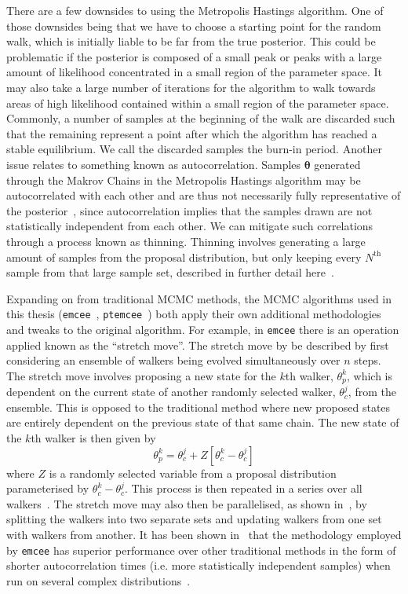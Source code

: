 %
%
%
There are a few downsides to using the Metropolis Hastings algorithm. One 
of those downsides being that we have to choose a starting point 
for the random walk, which is initially liable to be far from the 
true posterior. This could be problematic if the posterior is composed 
of a small peak or peaks with 
a large amount of likelihood concentrated in a small region of the 
parameter space. It may also take a large number of iterations for the 
algorithm to walk towards areas of high likelihood contained within 
a small region of the parameter space. Commonly, a number 
of samples at the beginning of the walk are discarded such that the 
remaining represent a point after which the algorithm has reached 
a stable equilibrium. We call the discarded samples 
the burn-in period. Another issue 
relates to something known as autocorrelation. Samples $\bm{\theta}$ 
generated through 
the Makrov Chains in the Metropolis Hastings algorithm may be 
autocorrelated with each 
other and are thus not necessarily fully 
representative of the posterior~\cite{2019PASA...36...10T}, since 
autocorrelation implies that the samples drawn are not statistically 
independent from each other. We can 
mitigate such correlations through a process known as thinning. 
Thinning involves generating a large amount of samples from the 
proposal distribution, but only keeping every $N^{\textrm{th}}$ 
sample from that large sample set, described in further detail
here~\cite{https://doi.org/10.1111/j.2041-210X.2011.00131.x}.  

%
%
Expanding on from traditional \ac{MCMC} methods, the \ac{MCMC} algorithms 
used in this thesis (\texttt{emcee}~\cite{emcee},
\texttt{ptemcee}~\cite{ptemcee}) both apply 
their own additional methodologies and tweaks to the original algorithm. 
For example, in \texttt{emcee} there is an operation applied known as the 
``stretch move''. The stretch move by be described by first 
considering an ensemble 
of walkers being evolved simultaneously over $n$ steps. The stretch 
move involves proposing a new state for the $k$th walker, $\theta_{p}^k$, 
which is dependent on the current state of another randomly 
selected walker, $\theta_{c}^{j}$, 
from the ensemble. This is opposed to the traditional method 
where new proposed states are entirely dependent on the previous state 
of that same chain. The new state of the $k$th walker is then given by 
%
\begin{equation}
    \theta_{p}^k = \theta_{c}^j + Z[\theta_{c}^k - \theta_{c}^j] 
\end{equation}
%
where $Z$ is a randomly selected variable from a proposal distribution 
parameterised by $\theta_{c}^k - \theta_{c}^j$. This process is then 
repeated in a series over all walkers~\cite{emcee}. The stretch move may also 
then be parallelised, as shown in~\cite{emcee}, by splitting the walkers 
into two separate sets and updating walkers from one set with 
walkers from another. It has been shown in~\cite{emcee} that the 
methodology employed by \texttt{emcee} has superior performance over 
other traditional methods in the form of shorter autocorrelation 
times (i.e. more statistically independent samples) when run on several complex distributions~\cite{emcee}.

